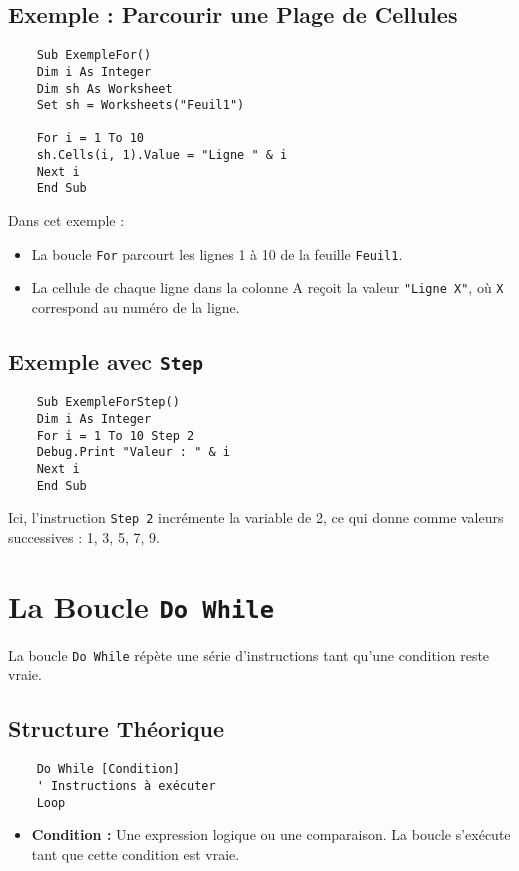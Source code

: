 \documentclass[a4paper,12pt]{report}
\begin{document}
\subsection*{Exemple : Parcourir une Plage de Cellules}
\begin{lstlisting}
	Sub ExempleFor()
	Dim i As Integer
	Dim sh As Worksheet
	Set sh = Worksheets("Feuil1")
	
	For i = 1 To 10
	sh.Cells(i, 1).Value = "Ligne " & i
	Next i
	End Sub
\end{lstlisting}

Dans cet exemple :
\begin{itemize}
	\item La boucle \texttt{For} parcourt les lignes 1 à 10 de la feuille \texttt{Feuil1}.
	\item La cellule de chaque ligne dans la colonne A reçoit la valeur \texttt{"Ligne X"}, où \texttt{X} correspond au numéro de la ligne.
\end{itemize}

\subsection*{Exemple avec \texttt{Step}}
\begin{lstlisting}
	Sub ExempleForStep()
	Dim i As Integer
	For i = 1 To 10 Step 2
	Debug.Print "Valeur : " & i
	Next i
	End Sub
\end{lstlisting}

Ici, l'instruction \texttt{Step 2} incrémente la variable de 2, ce qui donne comme valeurs successives : 1, 3, 5, 7, 9.

\section{La Boucle \texttt{Do While}}
La boucle \texttt{Do While} répète une série d'instructions tant qu'une condition reste vraie.

\subsection*{Structure Théorique}
\begin{lstlisting}
	Do While [Condition]
	' Instructions à exécuter
	Loop
\end{lstlisting}

\begin{itemize}
	\item \textbf{Condition :} Une expression logique ou une comparaison. La boucle s'exécute tant que cette condition est vraie.
\end{itemize}
\end{document}
